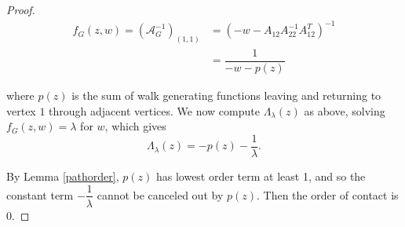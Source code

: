 \documentclass[10pt,a4paper]{amsart}
\newcommand\la{\lambda}
\newcommand{\A}{\mathcal{A}}
\newcommand{\inv}{^{-1}}
\begin{document}
\begin{proof}
    \begin{align*}
        f_G(z,w) = (\A_G\inv)_{(1,1)} &= (-w - A_{12}A_{22}^{-1}A_{12}^T)^{-1} \\
        &= \dfrac{1}{-w-p(z)}
    \end{align*}

   where $p(z)$ is the sum of walk generating functions leaving and returning to vertex $1$ through adjacent vertices. We now compute $\Lambda_\la(z)$ as above, solving $f_G(z,w) = \la$ for $w$, which gives
   \[
   \Lambda_\la(z) = -p(z) - \frac{1}{\la}.
   \]

 By Lemma \ref{pathorder}, $p(z)$ has lowest order term at least 1, and so the constant term $-\dfrac{1}{\la}$ cannot be canceled out by $p(z)$. Then the order of contact is $0$. 
    

\end{proof}
\end{document}
